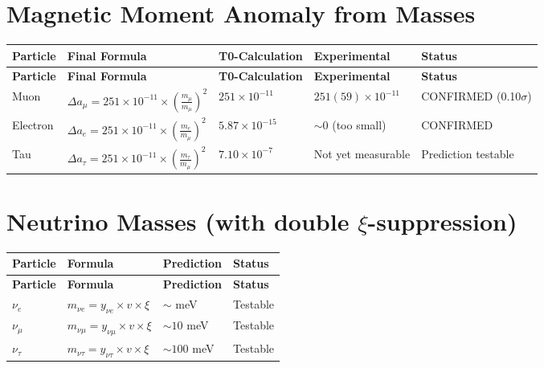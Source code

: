 \documentclass[12pt,a4paper]{article}
\begin{document}
	\section{Magnetic Moment Anomaly from Masses}
	
	\begin{longtable}{|p{2.5cm}|p{4.5cm}|p{3cm}|p{3cm}|p{2cm}|}
		\hline
		\textbf{Particle} & \textbf{Final Formula} & \textbf{T0-Calculation} & \textbf{Experimental} & \textbf{Status} \\
		\hline
		\endfirsthead
		\hline
		\textbf{Particle} & \textbf{Final Formula} & \textbf{T0-Calculation} & \textbf{Experimental} & \textbf{Status} \\
		\hline
		\endhead
		Muon & \(\Delta a_{\mu} = 251 \times 10^{-11} \times \left(\frac{m_{\mu}}{m_{\mu}}\right)^{2}\) & \(251 \times 10^{-11}\) & \(251(59) \times 10^{-11}\) & CONFIRMED (0.10\(\sigma\)) \\
		\hline
		Electron & \(\Delta a_{e} = 251 \times 10^{-11} \times \left(\frac{m_{e}}{m_{\mu}}\right)^{2}\) & \(5.87 \times 10^{-15}\) & \(\sim 0\) (too small) & CONFIRMED \\
		\hline
		Tau & \(\Delta a_{\tau} = 251 \times 10^{-11} \times \left(\frac{m_{\tau}}{m_{\mu}}\right)^{2}\) & \(7.10 \times 10^{-7}\) & Not yet measurable & Prediction testable \\
		\hline
	\end{longtable}
	
	\section{Neutrino Masses (with double \(\xi\)-suppression)}
	
	\begin{longtable}{|p{3cm}|p{4cm}|p{3cm}|p{3cm}|}
		\hline
		\textbf{Particle} & \textbf{Formula} & \textbf{Prediction} & \textbf{Status} \\
		\hline
		\endfirsthead
		\hline
		\textbf{Particle} & \textbf{Formula} & \textbf{Prediction} & \textbf{Status} \\
		\hline
		\endhead
		\(\nu_e\) & \(m_{\nu e} = y_{\nu e} \times v \times \xi\) & \(\sim\) meV & Testable \\
		\hline
		\(\nu_{\mu}\) & \(m_{\nu \mu} = y_{\nu \mu} \times v \times \xi\) & \(\sim 10\) meV & Testable \\
		\hline
		\(\nu_{\tau}\) & \(m_{\nu \tau} = y_{\nu \tau} \times v \times \xi\) & \(\sim 100\) meV & Testable \\
		\hline
	\end{longtable}
	
\end{document}
